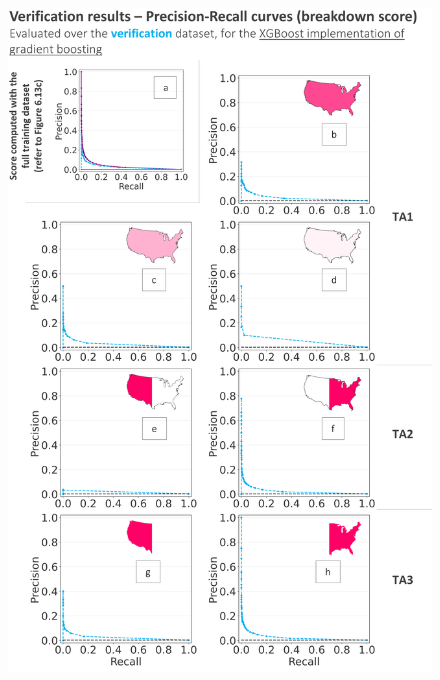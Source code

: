 \begin{figure}[htbp]
\label{fig:verif_breakdown_scores_roc_curve}
\end{figure}



\begin{figure}[htbp]
\centering
\includegraphics[scale = 0.95]{verif_breakdown_scores_pr_curve.png}

\end{figure}
